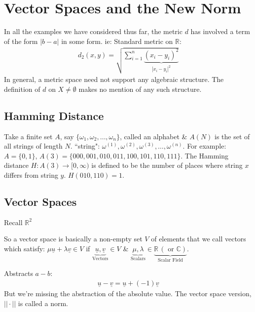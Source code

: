 \documentclass[10pt]{article}
\begin{document}
\newpage

\section{Vector Spaces and the New Norm}
In all the examples we have considered thus far, the metric $d$ has involved a term of the form $|b-a|$ in some form. ie: Standard metric on $\mathbb{R}$:
\begin{align*}
    d_{2}(x,y)=\sqrt{\sum^{n}_{i=1}\underbrace{(x_{i}-y_{i})^{2}}_{|x_{i}-y_{i}|^{2}}}
\end{align*}
In general, a metric space need not support any algebraic structure. The definition of $d$ on $X\neq\emptyset$ makes no mention of any such structure.

\subsection{Hamming Distance}
Take a finite set $A$, say $\{\omega_{1},\omega_{2},\dots,\omega_{n}\}$, called an alphabet \& $A(N)$ is the set of all strings of length $N$. ``string": $\omega^{(1)}, \omega^{(2)}, \omega^{(3)},\dots,\omega^{(n)}$. For example: $A=\{0,1\}$, $A(3)=\{000, 001, 010, 011, 100, 101, 110, 111\}$. The Hamming distance $H:A(3)\to[0,\infty)$ is defined to be the number of places where string $x$ differs from string $y$. $H(010,110)=1$.

\subsection{Vector Spaces}
Recall $\mathbb{R}^{2}$

\begin{multicols}{2}
So a vector space is basically a non-empty set $V$ of elements that we call vectors which satisfy: $\mu\underline{u}+\lambda\underline{v}\in V$ if $\underbrace{\underline{u}, \underline{v}}_{\text{Vectors}}\in V$ \& $\underbrace{\mu, \lambda}_{\text{Scalars}}\in\underbrace{\mathbb{R}\,(\text{ or } \mathbb{C})}_{\text{Scalar Field}}$.

Abstracts $a-b$:
\begin{align*}
    \underline{u}-\underline{v}=\underline{u}+(-1)\underline{v}
\end{align*}
But we're missing the abstraction of the absolute value. The vector space version, $||\cdot||$ is called a norm.

\end{multicols}
\end{document}
